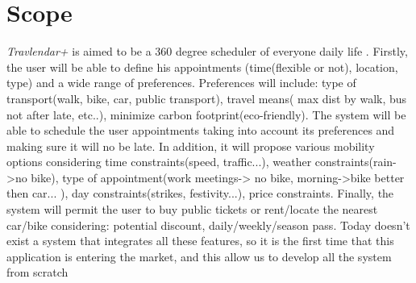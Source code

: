 \section{Scope}

\emph{Travlendar+} is aimed to be a 360 degree scheduler of everyone daily life .
Firstly, the user will be able to define his appointments (time(flexible or not), location, type) and a wide range of preferences. Preferences will include: type of transport(walk, bike, car, public transport), travel means( max dist by walk, bus not after late, etc..), minimize carbon footprint(eco-friendly). 
The system will be able to schedule the user appointments taking into account its preferences and making sure it will no be late. In addition, it will propose various mobility options considering time constraints(speed, traffic...), weather constraints(rain->no bike), type of appointment(work meetings-> no bike, morning->bike better then car... ), day constraints(strikes, festivity...), price constraints. 
Finally, the system will permit the user to buy public tickets or rent/locate the nearest car/bike considering: potential discount, daily/weekly/season pass.
Today doesn't exist a system that integrates all these features, so it is the first time that this application is entering the market, and this allow us to develop all the system from scratch  